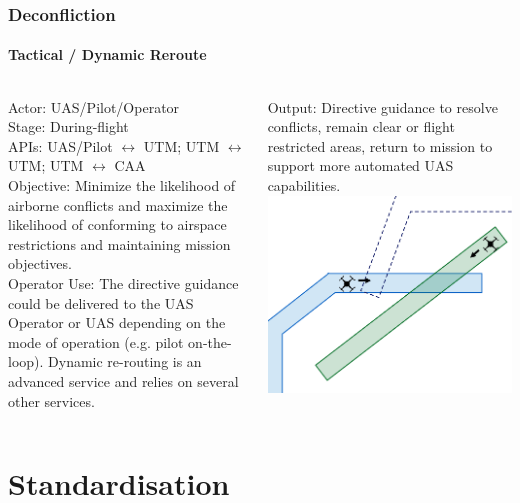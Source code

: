 \documentclass[usenames,dvipsnames,aspectratio=169,serif]{beamer}
\begin{document}
\begin{frame}
   \frametitle{Deconfliction}
   \framesubtitle{Tactical / Dynamic Reroute}
   \begin{columns}[t]
      \begin{column}{0.5\textwidth}
         Actor: UAS/Pilot/Operator \\
         Stage: During-flight \\
         APIs: UAS/Pilot $\leftrightarrow$ UTM; UTM $\leftrightarrow$ UTM; UTM $\leftrightarrow$ CAA \\
         Objective: Minimize the likelihood of airborne conflicts and maximize the likelihood of conforming to airspace restrictions and maintaining mission objectives. \\
         Operator Use: The directive guidance could be delivered to the UAS Operator or UAS depending on the mode of operation (e.g. pilot on-the-loop). Dynamic re-routing is an advanced service and relies on several other services.
      \end{column}
      \begin{column}{0.5\textwidth}
         Output: Directive guidance to resolve conflicts, remain clear or flight restricted areas, return to mission to support more automated UAS capabilities.
         \includegraphics[height=0.45\textwidth]{img/dynamic-rerouting.png}

      \end{column}
   \end{columns}
\end{frame}


\section{Standardisation}
\end{document}
